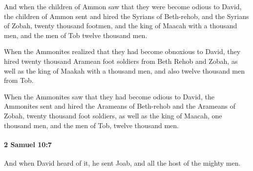 			\begin{versebox}
					\item[BHS] 
					\item[ASV] And when the children of Ammon saw that they were become odious to David, the children of Ammon sent and hired the Syrians of Beth-rehob, and the Syrians of Zobah, twenty thousand footmen, and the king of Maacah with a thousand men, and the men of Tob twelve thousand men.
					\item[NIV] When the Ammonites realized that they had become obnoxious to David, they hired twenty thousand Aramean foot soldiers from Beth Rehob and Zobah, as well as the king of Maakah with a thousand men, and also twelve thousand men from Tob.
					\item[NRSV] When the Ammonites saw that they had become odious to David, the Ammonites sent and hired the Arameans of Beth-rehob and the Arameans of Zobah, twenty thousand foot soldiers, as well as the king of Maacah, one thousand men, and the men of Tob, twelve thousand men.
			\end{versebox}

		\paragraph{2 Samuel 10:7} %
			\label{2SAMUEL-10-7}

			And when David heard of it, he sent Joab, and all the host of the mighty men.


